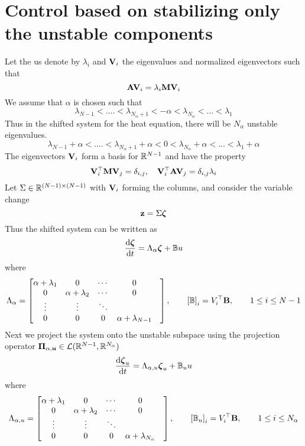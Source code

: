 \documentclass[12pt]{article}
\begin{document}

\section{Control based on stabilizing only the unstable components}
Let the us denote by $\lambda_i$ and ${\mathbf V}_i$ the eigenvalues and normalized eigenvectors such that
\[
 {\mathbf A} {\mathbf V}_i = \lambda_i {\mathbf M} {\mathbf V}_i
\]
We assume that $\alpha$ is chosen such that
\[
 \lambda_{N-1} < .... <\lambda_{N_\alpha +1} < -\alpha < \lambda_{N_\alpha} < ... < \lambda_1
\]
Thus in the shifted system for the heat equation, there will be $N_\alpha$ unstable eigenvalues.
\[
 \lambda_{N-1} + \alpha < .... <\lambda_{N_\alpha +1} + \alpha < 0 < \lambda_{N_\alpha} + \alpha < ... < \lambda_1 + \alpha
\]
The eigenvectors ${\mathbf V}_i$ form a basis for $\mathbb{R}^{N-1}$ and have the property
\[
 {\mathbf V}_i^\top {\mathbf M} {\mathbf V}_j = \delta_{i,j}, \quad {\mathbf V}_i^\top {\mathbf A} {\mathbf V}_j = \delta_{i,j} \lambda_i
\]
Let $\Sigma \in \mathbb{R}^{(N-1) \times (N-1)}$ with ${\mathbf V}_i$ forming the columns, and consider the variable change
\[
 {\mathbf z} = \Sigma \boldsymbol{\zeta}
\]
Thus the shifted system can be written as
\[
 \frac{\textrm{d} \boldsymbol{\zeta}}{\textrm{d} t} = \Lambda_\alpha \boldsymbol{\zeta} + \mathbb{B} u
\]
where
\[
 \Lambda_\alpha = \begin{bmatrix}
                   \alpha + \lambda_1 & 0 & \cdots & 0\\
                   0 & \alpha + \lambda_2 & \cdots & 0\\
                   \vdots & \vdots & \ddots & &\\
                   0 & 0 & 0 & \alpha + \lambda_{N-1}
                  \end{bmatrix}, \qquad
 \left[\mathbb{B}\right]_i = V^\top_i {\mathbf B}, \qquad  1 \le i \le N-1                                   
\]
Next we project the system onto the unstable subspace using the projection operator $\mathbf{\Pi_{\alpha,u}} \in \mathcal{L}(\mathbb{R}^{N-1},\mathbb{R}^{N_\alpha})$
\[
 \frac{\textrm{d} \boldsymbol{\zeta}_u}{\textrm{d} t} = \Lambda_{\alpha,u} \boldsymbol{\zeta}_u + \mathbb{B}_u u
\]
where
\[
 \Lambda_{\alpha,u} = \begin{bmatrix}
                   \alpha + \lambda_1 & 0 & \cdots & 0\\
                   0 & \alpha + \lambda_2 & \cdots & 0\\
                   \vdots & \vdots & \ddots & &\\
                   0 & 0 & 0 & \alpha + \lambda_{N_\alpha}
                  \end{bmatrix}, \qquad
 \left[\mathbb{B}_u \right]_i = V^\top_i {\mathbf B}, \qquad 1 \le i \le N_\alpha                                   
\]
\end{document}
